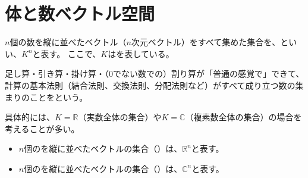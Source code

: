 \documentclass[../../../topic_linear-algebra]{subfiles}
\begin{document}
\sectionline
\section{体と数ベクトル空間}

$n$個の数を縦に並べたベクトル（$n$次元ベクトル）をすべて集めた集合を、といい、$K^n$と表す。
ここで、$K$はを表している。

\br

\begin{handout}[補足：体とはなにか？]
  足し算・引き算・掛け算・（0でない数での）割り算が「普通の感覚で」できて、計算の基本法則（結合法則、交換法則、分配法則など）がすべて成り立つ数の集まりのことをという。
\end{handout}

具体的には、$K = \mathbb{R}$（実数全体の集合）や$K = \mathbb{C}$（複素数全体の集合）の場合を考えることが多い。
\begin{itemize}
  \item $n$個のを縦に並べたベクトルの集合（）は、$\mathbb{R}^n$と表す。
  \item $n$個のを縦に並べたベクトルの集合（）は、$\mathbb{C}^n$と表す。
\end{itemize}
\end{document}
